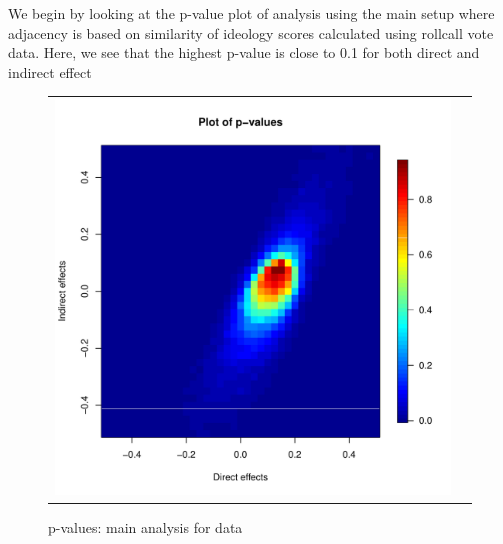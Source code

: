 \documentclass[12pt]{article}
\begin{document}
We begin by looking at the p-value plot of analysis using the main setup where adjacency is based on similarity of ideology scores calculated using rollcall vote data. Here, we see that the highest p-value is close to 0.1 for both direct and indirect effect
\begin{figure}
	\centering
	\begin{tabular}{cc}
	\includegraphics[scale=0.5]{./images/pvalues_figure_main_Bergan.pdf}
	\end{tabular}
	\caption{p-values: main analysis for \citet{bergan2015call} data}
\end{figure}
\end{document}
